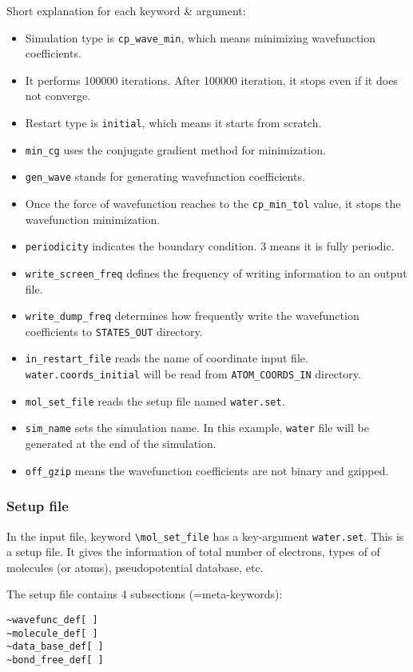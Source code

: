 Short explanation for each keyword \& argument:
\begin{itemize}
\item Simulation type is \verb+cp_wave_min+, which means minimizing wavefunction coefficients.
\item It performs 100000 iterations. After 100000 iteration, it stops even if it does not converge.
\item Restart type is \verb+initial+, which means it starts from scratch.
\item \verb+min_cg+ uses the conjugate gradient method for minimization.
\item \verb+gen_wave+ stands for generating wavefunction coefficients.
\item Once the force of wavefunction reaches to the \verb+cp_min_tol+ value, it stops the wavefunction minimization.
\item \verb+periodicity+ indicates the boundary condition. 3 means it is fully periodic.
\item \verb+write_screen_freq+ defines the frequency of writing information to an output file. 
\item \verb+write_dump_freq+ determines how frequently write the wavefunction coefficients to \verb+STATES_OUT+ directory. 
\item \verb+in_restart_file+ reads the name of coordinate input file. \verb+water.coords_initial+ will be read from \verb+ATOM_COORDS_IN+ directory.
\item \verb+mol_set_file+ reads the setup file named \verb+water.set+. 
\item \verb+sim_name+ sets the simulation name. In this example, \verb+water+ file will be generated at the end of the simulation.
\item \verb+off_gzip+ means the wavefunction coefficients are not binary and gzipped.
\end{itemize}


\subsubsection{Setup file}
In the input file, keyword \verb+\mol_set_file+ has a key-argument \verb+water.set+. This is a setup file. It gives the information of total number of electrons, types of of molecules (or atoms), pseudopotential database, etc.

The setup file contains 4 subsections (=meta-keywords):
\begin{verbatim}
~wavefunc_def[ ]
~molecule_def[ ]
~data_base_def[ ]
~bond_free_def[ ]
\end{verbatim}

